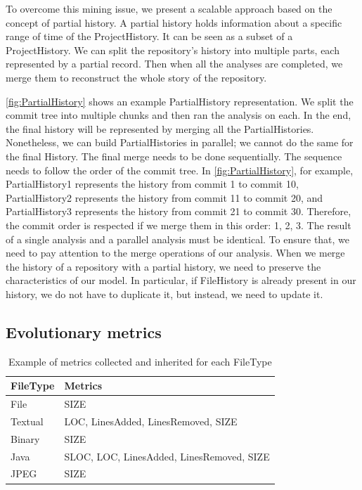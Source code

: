 To overcome this mining issue, we present a scalable approach based on the concept of partial history.
A partial history holds information about a specific range of time of the ProjectHistory. 
It can be seen as a subset of a ProjectHistory. 
We can split the repository's history into multiple parts, each represented by a partial record. Then when all the analyses are completed, we merge them to reconstruct the whole story of the repository.


\autoref{fig:PartialHistory} shows an example PartialHistory representation. 
We split the commit tree into multiple chunks and then ran the analysis on each. 
In the end, the final history will be represented by merging all the PartialHistories. 
Nonetheless, we can build PartialHistories in parallel; we cannot do the same for the final History. 
The final merge needs to be done sequentially. The sequence needs to follow the order of the commit tree. 
In \autoref{fig:PartialHistory}, for example,
PartialHistory1 represents the history from commit 1 to commit 10, 
PartialHistory2 represents the history from commit 11 to commit 20, and 
PartialHistory3 represents the history from commit 21 to commit 30.
Therefore, the commit order is respected if we merge them in this order: 1, 2, 3. 
The result of a single analysis and a parallel analysis must be identical. 
To ensure that, we need to pay attention to the merge operations of our analysis.
When we merge the history of a repository with a partial history, we need to preserve the characteristics of our model. 
In particular, if FileHistory is already present in our history, we do not have to duplicate it, but instead, we need to update it. 
\label{s:evolutionaryMetrics}
\subsection*{Evolutionary metrics}

\begin{table}[ht]
    \centering
        \begin{tabular}{@{}ll@{}} 
        \toprule
        \textbf{FileType} & \textbf{Metrics} \\\midrule
        File    & SIZE      \\
        Textual & LOC, LinesAdded, LinesRemoved, SIZE \\
        Binary  & SIZE         \\
        Java    & SLOC, LOC, LinesAdded, LinesRemoved, SIZE \\
        JPEG    & SIZE \\\bottomrule
    \end{tabular}
    \caption{Example of metrics collected and inherited for each FileType}
    \label{table:metricsT}
\end{table}

